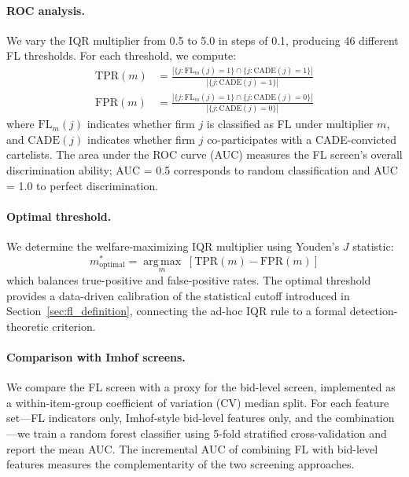 \paragraph{ROC analysis.}
We vary the IQR multiplier from 0.5 to 5.0 in steps of 0.1, producing
46 different FL thresholds. For each threshold, we compute:
\begin{align}
  \text{TPR}(m) &= \frac{|\{j : \text{FL}_m(j)=1\} \cap
    \{j : \text{CADE}(j)=1\}|}{|\{j : \text{CADE}(j)=1\}|}
  \label{eq:tpr} \\
  \text{FPR}(m) &= \frac{|\{j : \text{FL}_m(j)=1\} \cap
    \{j : \text{CADE}(j)=0\}|}{|\{j : \text{CADE}(j)=0\}|}
  \label{eq:fpr}
\end{align}
where $\text{FL}_m(j)$ indicates whether firm $j$ is classified as FL
under multiplier $m$, and $\text{CADE}(j)$ indicates whether firm $j$
co-participates with a CADE-convicted cartelists. The area under the ROC
curve (AUC) measures the FL screen's overall discrimination ability; AUC
= 0.5 corresponds to random classification and AUC = 1.0 to perfect
discrimination.

\paragraph{Optimal threshold.}
We determine the welfare-maximizing IQR multiplier using Youden's $J$
statistic:
\begin{equation}
  m^*_{\text{optimal}} = \operatorname*{arg\,max}_m \;
  \left[\text{TPR}(m) - \text{FPR}(m)\right]
  \label{eq:youden}
\end{equation}
which balances true-positive and false-positive rates. The optimal
threshold provides a data-driven calibration of the statistical cutoff
introduced in Section~\ref{sec:fl_definition}, connecting the ad-hoc
IQR rule to a formal detection-theoretic criterion.

\paragraph{Comparison with Imhof screens.}
We compare the FL screen with a proxy for the \citet{imhof2019detecting}
bid-level screen, implemented as a within-item-group coefficient of
variation (CV) median split. For each feature set---FL indicators only,
Imhof-style bid-level features only, and the combination---we train a
random forest classifier using 5-fold stratified cross-validation and
report the mean AUC. The incremental AUC of combining FL with bid-level
features measures the complementarity of the two screening approaches.

